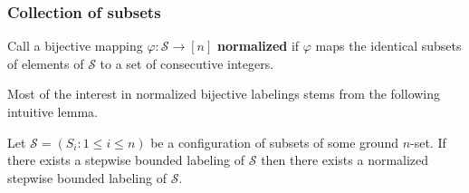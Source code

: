 \documentclass[unknownkeysallowed,11pt]{beamer}
\begin{document}
\begin{frame}
  \frametitle{Collection of subsets}

  \begin{definition}
    Call a bijective mapping
    $\varphi : \mathcal{S} \to [n]$ \textbf{normalized} if $\varphi$
    maps the identical subsets of elements of $\mathcal{S}$
    to a set of consecutive integers.
  \end{definition}


  \bigskip

  Most of the interest in normalized bijective labelings
  stems from the following intuitive lemma.

  \bigskip

  \begin{lemma}
    Let $\mathcal{S} = (S_i : 1 \leq i \leq n)$ be a configuration of subsets of
    some ground $n$-set.
    If there exists a stepwise bounded labeling of $\mathcal{S}$
    then there exists a normalized stepwise bounded labeling of $\mathcal{S}$.
  \end{lemma}
\end{frame}

\end{document}
